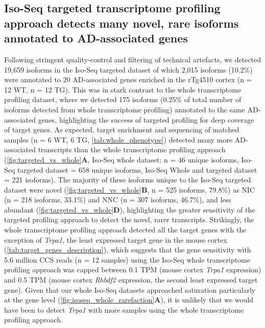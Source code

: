 \newpage
\subsection{Iso-Seq targeted transcriptome profiling approach detects many novel, rare isoforms annotated to AD-associated genes}
\label{ch6: wholevstargeted}
Following stringent quality-control and filtering of technical artefacts, we detected 19,659 isoforms in the Iso-Seq targeted dataset of which 2,015 isoforms (10.2\%) were annotated to 20 AD-associated genes enriched in the rTg4510 cortex (n = 12 WT, n = 12 TG). This was in stark contrast to the whole transcriptome profiling dataset, where we detected 175 isoforms (0.25\% of total number of isoforms detected from whole transcriptome profiling) annotated to the same AD-associated genes, highlighting the success of targeted profiling for deep coverage of target genes. As expected, target enrichment and sequencing of matched samples (n = 6 WT, 6 TG, \cref{tab:whole_phenotype}) detected many more AD-associated transcripts than the whole transcriptome profiling approach (\cref{fig:targeted_vs_whole}\textbf{A}, Iso-Seq whole dataset: n = 46 unique isoforms, Iso-Seq targeted dataset = 658 unique isoforms, Iso-Seq Whole and targeted dataset = 221 isoforms). The majority of these isoforms unique to the Iso-Seq targeted dataset were novel (\cref{fig:targeted_vs_whole}\textbf{B}, n = 525 isoforms, 79.8\%) as NIC (n = 218 isoforms, 33.1\%) and NNC (n = 307 isoforms, 46.7\%), and less abundant (\cref{fig:targeted_vs_whole}\textbf{D}), highlighting the greater sensitivity of the targeted profiling approach to detect the novel, rarer transcripts. Strikingly, the whole transcriptome profiling approach detected all the target genes with the exception of \textit{Trpa1}, the least expressed target gene in the mouse cortex (\cref{tab:target_genes_description}), which suggests that the gene sensitivity with 5.6 million CCS reads (n = 12 samples) using the Iso-Seq whole transcriptome profiling approach was capped between 0.1 TPM (mouse cortex \textit{Trpa1} expression) and 0.5 TPM (mouse cortex \textit{Rhbdf2} expression, the second least expressed target gene). Given that our whole Iso-Seq datasets approached saturation particularly at the gene level (\cref{fig:isoseq_whole_rarefaction}\textbf{A}), it is unlikely that we would have been to detect \textit{Trpa1} with more samples using the whole transcriptome profiling approach.

